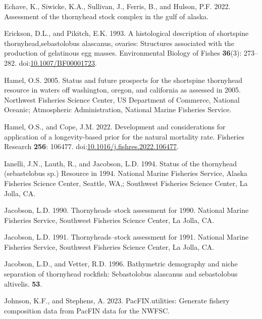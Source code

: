 \documentclass[11pt,
  english,
  letterpaper,
]{article}
\newlength{\cslhangindent}
\newenvironment{CSLReferences}[2] %
 {%
  \setlength{\parindent}{0pt}
  \ifodd #1 \everypar{\setlength{\hangindent}{\cslhangindent}}\ignorespaces\fi
  \ifnum #2 > 0
  \setlength{\parskip}{#2\baselineskip}
  \fi
 }%
 {}
\begin{document}
\begin{CSLReferences}{1}{0}
\leavevmode{}%
Echave, K., Siwicke, K.A., Sullivan, J., Ferris, B., and Hulson, P.F. 2022. Assessment of the thornyhead stock complex in the gulf of alaska.

\leavevmode{}%
Erickson, D.L., and Pikitch, E.K. 1993. A histological description of shortspine thornyhead,sebastolobus alascanus, ovaries: Structures associated with the production of gelatinous egg masses. Environmental Biology of Fishes \textbf{36}(3): 273--282. doi:\href{https://doi.org/10.1007/BF00001723}{10.1007/BF00001723}.

\leavevmode{}%
Hamel, O.S. 2005. Status and future prospects for the shortspine thornyhead resource in waters off washington, oregon, and california as assessed in 2005. Northwest Fisheries Science Center, US Department of Commerce, National Oceanic; Atmospheric Administration, National Marine Fisheries Service.

\leavevmode{}%
Hamel, O.S., and Cope, J.M. 2022. Development and considerations for application of a longevity-based prior for the natural mortality rate. Fisheries Research \textbf{256}: 106477. doi:\href{https://doi.org/10.1016/j.fishres.2022.106477}{10.1016/j.fishres.2022.106477}.

\leavevmode{}%
Ianelli, J.N., Lauth, R., and Jacobson, L.D. 1994. Status of the thornyhead (sebastelobus sp.) Resource in 1994. National Marine Fisheries Service, Alaska Fisheries Science Center, Seattle, {WA},; Southwest Fisheries Science Center, La Jolla, {CA}.

\leavevmode{}%
Jacobson, L.D. 1990. Thornyheads--stock assessment for 1990. National Marine Fisheries Service, Southwest Fisheries Science Center, La Jolla, {CA}.

\leavevmode{}%
Jacobson, L.D. 1991. Thornyheads--stock assessment for 1991. National Marine Fisheries Service, Southwest Fisheries Science Center, La Jolla, {CA}.

\leavevmode{}%
Jacobson, L.D., and Vetter, R.D. 1996. Bathymetric demography and niche separation of thornyhead rockfish: Sebastolobus alascanus and sebastolobus altivelis. \textbf{53}.

\leavevmode{}%
Johnson, K.F., and Stephens, A. 2023. PacFIN.utilities: Generate fishery composition data from PacFIN data for the NWFSC.


\end{CSLReferences}
\end{document}

